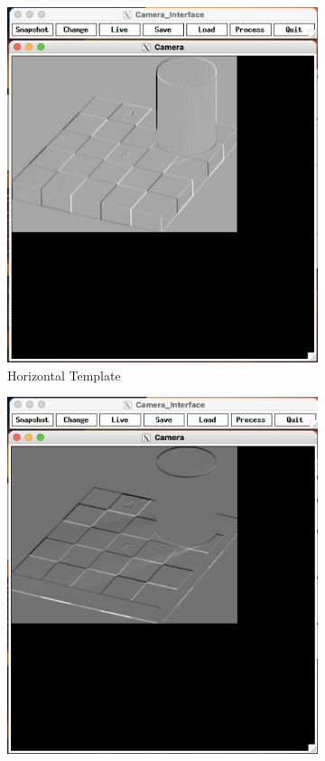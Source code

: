 \documentclass[12pt]{article}
\begin{document}
\begin{figure}
	\centering
	\begin{subfigure}[b]{0.475\textwidth}
		\centering
		\includegraphics[width=\textwidth]{hw3_results/p1_chess_hor}
		\caption[]%
		{{\small Horizontal Template}}    
		\label{fig:mean and std of net14}
	\end{subfigure}
	\hfill
	\begin{subfigure}[b]{0.475\textwidth}  
		\centering 
		\includegraphics[width=\textwidth]{hw3_results/p1_chess_vert}

\end{subfigure}
\end{figure}
\end{document}
